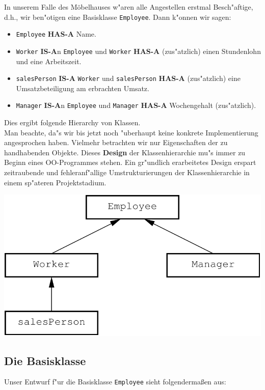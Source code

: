 %
%
In unserem Falle des Möbelhauses w"aren alle Angestellen erstmal Besch"aftige, d.h.,
wir ben"otigen eine Basisklasse \texttt{Employee}.
Dann k"onnen wir sagen:
\begin{itemize}
 \item \texttt{Employee} \textbf{HAS-A} Name.
 \item \texttt{Worker} \textbf{IS-A}n \texttt{Employee} und
       \texttt{Worker} \textbf{HAS-A} (zus"atzlich)  einen Stundenlohn und
       eine Arbeitszeit.
 \item \texttt{salesPerson} \textbf{IS-A} \texttt{Worker} und
       \texttt{salesPerson} \textbf{HAS-A} (zus"atzlich)   eine Umsatzbeteiligung am
       erbrachten Umsatz.
 \item \texttt{Manager} \textbf{IS-A}n \texttt{Employee} und
       \texttt{Manager} \textbf{HAS-A} Wochengehalt (zus"atzlich).
\end{itemize}
\begin{minipage}{0.45\textwidth}
Dies ergibt folgende Hierarchy von Klassen. \\
Man beachte, da"s wir bis jetzt noch "uberhaupt keine konkrete
Implementierung angesprochen haben. Vielmehr betrachten wir
nur Eigenschaften der zu handhabenden Objekte. Dieses \textbf{Design}
der Klassenhierarchie
mu"s immer zu Beginn eines OO-Programmes stehen.
Ein gr"undlich erarbeitetes Design erspart zeitraubende und fehleranf"allige
Umstrukturierungen der Klassenhierarchie in einem sp"ateren
Projektstadium.
\end{minipage}
\hfill
\begin{minipage}{0.5\textwidth}
% 
\label{class_hierarchy}
\centerline{\includegraphics[scale=0.5]{hier1}}
\end{minipage}
%
%
\subsection{Die Basisklasse}
\label{sec:A1.2}
%
Unser Entwurf f"ur die Basisklasse \texttt{Employee}
sieht folgendermaßen aus:

